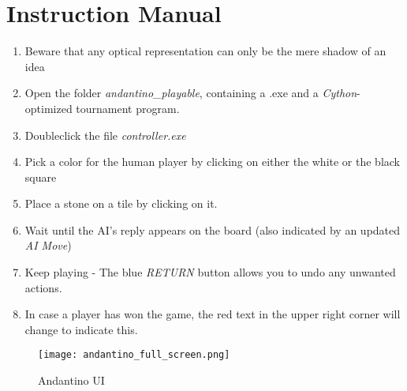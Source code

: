 \appendix
\section{Instruction Manual}


\begin{enumerate}
    \item Beware that any optical representation can only be the mere shadow of an idea
    \item Open the folder \textit{andantino\_playable}, containing a .exe and a \textit{Cython}-optimized tournament program.
    \item Doubleclick the file \textit{controller.exe}
    \item Pick a color for the  human player by clicking on either the white or the black square
    \item Place a stone on a tile by clicking on it.
    \item Wait until the AI's reply appears on the board (also indicated by an updated \textit{AI Move})
    \item Keep playing - The blue \textit{RETURN} button allows you to undo any unwanted actions.
    \item In case a player has won the game, the red text in the upper right corner will change to indicate this.
\end{enumerate}

\begin{figure}[H]
    \centering
    \texttt{[image: andantino\_full\_screen.png]}
    \caption{Andantino UI}
\end{figure}
